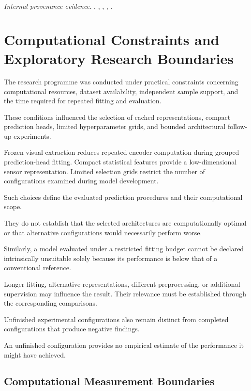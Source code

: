 \noindent\textit{Internal provenance evidence.} , , , , .

\section{Computational Constraints and Exploratory Research Boundaries}
\label{sec:ch4-boundaries}

The research programme was conducted under practical constraints concerning computational resources, dataset availability, independent sample support, and the time required for repeated fitting and evaluation.

These conditions influenced the selection of cached representations, compact prediction heads, limited hyperparameter grids, and bounded architectural follow-up experiments.

Frozen visual extraction reduces repeated encoder computation during grouped prediction-head fitting. Compact statistical features provide a low-dimensional sensor representation. Limited selection grids restrict the number of configurations examined during model development.

Such choices define the evaluated prediction procedures and their computational scope.

They do not establish that the selected architectures are computationally optimal or that alternative configurations would necessarily perform worse.

Similarly, a model evaluated under a restricted fitting budget cannot be declared intrinsically unsuitable solely because its performance is below that of a conventional reference.

Longer fitting, alternative representations, different preprocessing, or additional supervision may influence the result. Their relevance must be established through the corresponding comparisons.

Unfinished experimental configurations also remain distinct from completed configurations that produce negative findings.

An unfinished configuration provides no empirical estimate of the performance it might have achieved.

\subsection{Computational Measurement Boundaries}

